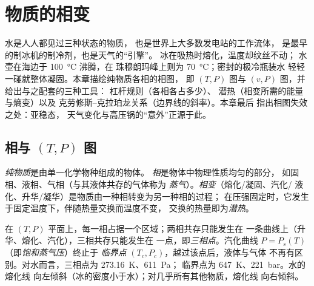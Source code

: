 \chapter{物质的相变}\label{ch:b1:phase-changes}

水是人人都见过三种状态的物质，
也是世界上大多数发电站的工作流体，
是最早的制冰机的制冷剂，也是天气的“引擎”。
冰在吸热时熔化，温度却纹丝不动；
水壶在海边于 \qty{100}{\degreeCelsius} 沸腾，在
珠穆朗玛峰上则为 \qty{70}{\degreeCelsius}；密封的极冷瓶装水
轻轻一碰就整体凝固。本章描绘纯物质各相的相图，
即 $(T, P)$ 图与 $(v, P)$ 图，并给出与之配套的三种工具：
杠杆规则（各相各占多少）、
潜热（相变所需的能量与熵变）以及
克劳修斯–克拉珀龙关系（边界线的斜率）。本章最后
指出相图失效之处：亚稳态，
天气变化与高压锅的“意外”正源于此。

\section{相与 $(T, P)$ 图}

\begin{definition}[纯物质、相、相变]\label{def:b1:phase-changes:phase}
\emph{纯物质}是由单一化学物种组成的物体。
\emph{相}是物体中物理性质均匀的部分，
如固相、液相、气相（与其液体共存的气体称为
\emph{蒸气}）。\emph{相变}（熔化/凝固、汽化/
液化、升华/凝华）是物质由一种相转变为另一种相的过程；
在压强固定时，它发生于固定温度下，伴随热量交换而温度不变，
交换的热量即为\emph{潜热}。
\end{definition}

\begin{proposition}[平衡相图]\label{prop:b1:phase-changes:PTdiagram}
在 $(T, P)$ 平面上，每一相占据一个区域；两相共存只能发生在
一条曲线上（升华、熔化、汽化），三相共存只能发生在
一点，即\emph{三相点}。汽化曲线
$P = P_s(T)$（即\emph{饱和蒸气压}）终止于
\emph{临界点} $(T_c, P_c)$，越过该点后，液体与气体
不再有区别。对水而言，三相点为 \qty{273.16}{K}、\qty{611}{Pa}；
临界点为 \qty{647}{K}、\qty{221}{bar}。水的熔化线
向左倾斜（冰的密度小于水）；对几乎所有其他物质，熔化线
向右倾斜。
\end{proposition}
\admitted

